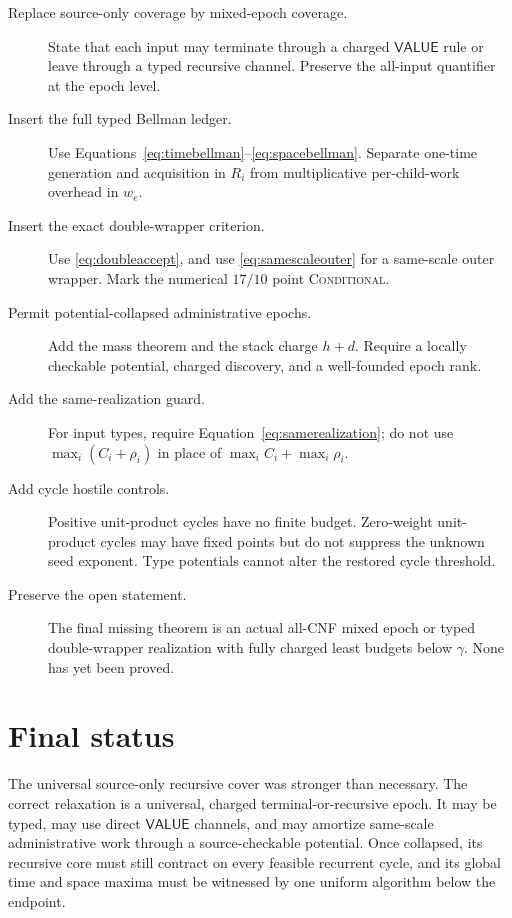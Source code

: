 \documentclass[11pt]{article}
\newcommand{\VALUE}{\mathsf{VALUE}}
\begin{document}
\begin{description}
\item[Replace source-only coverage by mixed-epoch coverage.]
State that each input may terminate through a charged \(\VALUE\) rule or
leave through a typed recursive channel.  Preserve the all-input quantifier
at the epoch level.

\item[Insert the full typed Bellman ledger.]
Use Equations~\eqref{eq:timebellman}--\eqref{eq:spacebellman}.  Separate
one-time generation and acquisition in \(R_i\) from multiplicative
per-child-work overhead in \(w_e\).

\item[Insert the exact double-wrapper criterion.]
Use \eqref{eq:doubleaccept}, and use \eqref{eq:samescaleouter} for a
same-scale outer wrapper.  Mark the numerical \(17/10\) point
\textsc{Conditional}.

\item[Permit potential-collapsed administrative epochs.]
Add the mass theorem and the stack charge \(h+d\).  Require a locally
checkable potential, charged discovery, and a well-founded epoch rank.

\item[Add the same-realization guard.]
For input types, require Equation~\eqref{eq:samerealization}; do not use
\(\max_i(C_i+\rho_i)\) in place of \(\max_iC_i+\max_i\rho_i\).

\item[Add cycle hostile controls.]
Positive unit-product cycles have no finite budget.  Zero-weight unit-product
cycles may have fixed points but do not suppress the unknown seed exponent.
Type potentials cannot alter the restored cycle threshold.

\item[Preserve the open statement.]
The final missing theorem is an actual all-CNF mixed epoch or typed
double-wrapper realization with fully charged least budgets below
\(\gamma\).  None has yet been proved.
\end{description}

\section{Final status}

The universal source-only recursive cover was stronger than necessary.  The
correct relaxation is a universal, charged terminal-or-recursive epoch.  It
may be typed, may use direct \(\VALUE\) channels, and may amortize same-scale
administrative work through a source-checkable potential.  Once collapsed,
its recursive core must still contract on every feasible recurrent cycle,
and its global time and space maxima must be witnessed by one uniform
algorithm below the endpoint.
\end{document}
